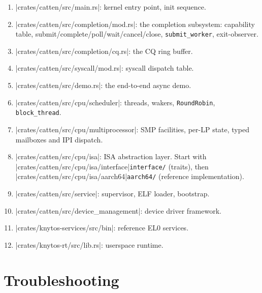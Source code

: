 \begin{enumerate}
    \item \repofile|crates/catten/src/main.rs|: kernel entry point, init
        sequence.
    \item \repofile|crates/catten/src/completion/mod.rs|: the completion
        subsystem: capability table, submit/complete/poll/wait/cancel/close,
        \texttt{submit\_worker}, exit-observer.
    \item \repofile|crates/catten/src/completion/cq.rs|: the CQ ring buffer.
    \item \repofile|crates/catten/src/syscall/mod.rs|: syscall dispatch table.
    \item \repofile|crates/catten/src/demo.rs|: the end-to-end async demo.
    \item \repodir|crates/catten/src/cpu/scheduler|: threads, wakers,
        \texttt{RoundRobin}, \texttt{block\_thread}.
    \item \repodir|crates/catten/src/cpu/multiprocessor|: SMP facilities,
        per-LP state, typed mailboxes and IPI dispatch.
    \item \repodir|crates/catten/src/cpu/isa|: ISA abstraction layer.
        Start with \repodirtext|crates/catten/src/cpu/isa/interface|{\texttt{interface/}}
        (traits), then
        \repodirtext|crates/catten/src/cpu/isa/aarch64|{\texttt{aarch64/}}
        (reference implementation).
    \item \repodir|crates/catten/src/service|: supervisor, ELF loader,
        bootstrap.
    \item \repodir|crates/catten/src/device_management|: device driver
        framework.
    \item \repodir|crates/knytos-services/src/bin|: reference EL0 services.
    \item \repofile|crates/knytos-rt/src/lib.rs|: userspace runtime.
\end{enumerate}

\section{Troubleshooting}

